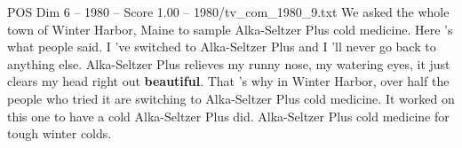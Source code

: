 \begin{textsample}{POS Dim 6 – 1980 – Score 1.00 – 1980/tv\_com\_1980\_9.txt}  \label{ex:f6_pos_051}
We asked the whole town of Winter Harbor, Maine to sample Alka-Seltzer Plus cold medicine.
Here 's what people said.
I 've switched to Alka-Seltzer Plus and I 'll never go back to anything else.
Alka-Seltzer Plus relieves my runny nose, my watering eyes, it just clears my head right out \textbf{beautiful}.
That 's why in Winter Harbor, over half the people who tried it are switching to Alka-Seltzer Plus cold medicine.
It worked on this one to have a cold Alka-Seltzer Plus did.
Alka-Seltzer Plus cold medicine for tough winter colds.

\end{textsample}
